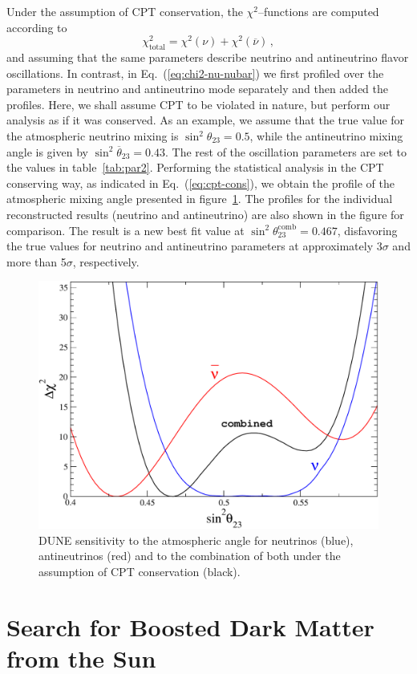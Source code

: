 Under the assumption of CPT conservation, the $\chi^2$--functions are computed according to
%
\begin{equation}
 \chi^2_{\text{total}}=\chi^2(\nu)+\chi^2(\overline{\nu})\, ,
 \label{eq:cpt-cons}
\end{equation}
%
and assuming that the same parameters describe neutrino and antineutrino flavor oscillations. In contrast, in Eq.~(\ref{eq:chi2-nu-nubar}) we first profiled over the parameters in neutrino and antineutrino mode separately and then added the profiles. Here, we shall assume CPT to be violated in nature, but perform our analysis as if it was conserved. As an example, we assume that the true value for the atmospheric neutrino mixing is $\sin^2\theta_{23}=0.5$, while the antineutrino mixing angle is given by $\sin^2\overline{\theta}_{23}=0.43$. The rest of the oscillation parameters are set to the values in table~\ref{tab:par2}. Performing the statistical analysis in the CPT conserving way, as indicated in Eq.~(\ref{eq:cpt-cons}), we obtain the profile of the atmospheric mixing angle presented in figure~\ref{fig:imposter-sq23}. The profiles for the individual reconstructed results (neutrino and antineutrino) are also shown in the figure for comparison.
The result is a new best fit value at $\sin^2\theta^\text{comb}_{23}=0.467$, disfavoring the true values for neutrino and antineutrino parameters at approximately 3$\sigma$ and more than 5$\sigma$, respectively. 

\begin{figure}[!htb]
 \centering
        \includegraphics[width=0.6\columnwidth]{graphics/imposter-sq23.pdf}
        \caption{DUNE sensitivity to the atmospheric angle for neutrinos (blue), antineutrinos (red) and to the combination of both under the assumption of CPT conservation (black).
         }
	\label{fig:imposter-sq23}
\end{figure}

\section{Search for Boosted Dark Matter from the Sun}

